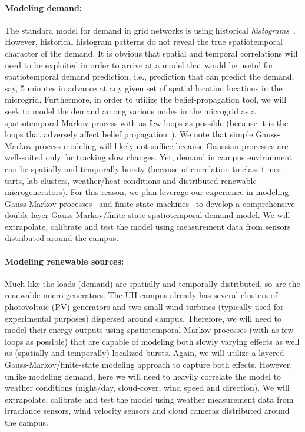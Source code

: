 \paragraph{Modeling demand:} The standard model for demand in grid
networks is using historical {\em histograms}~\cite{several}.
However, historical histogram patterns do not reveal the true
spatiotemporal character of the demand. It is obvious that spatial
and temporal correlations will need to be exploited in order to
arrive at a model that would be useful for spatiotemporal demand
prediction, i.e., prediction that can predict the demand, say, 5
minutes in advance at any given set of spatial location locations in
the microgrid. Furthermore, in order to utilize the
belief-propagation tool, we will seek to model the demand among
various nodes in the microgrid as a spatiotemporal Markov process
with as few loops as possible (because it is the loops that
adversely affect belief propagation~\cite{a,b,c}). We note that
simple Gauss-Markov process modeling will likely not suffice because
Gaussian processes are well-suited only for tracking slow changes.
Yet, demand in campus environment can be spatially and temporally
bursty (because of correlation to class-times tarts, lab-clusters,
weather/heat conditions and distributed renewable microgenerators).
For this reason, we plan leverage our experience in modeling
Gauss-Markov processes~\cite{my-own} and finite-state
machines~\cite{my-own} to develop a comprehensive double-layer
Gauss-Markov/finite-state spatiotemporal demand model. We will
extrapolate, calibrate and test the model using measurement data
from sensors distributed around the campus.

\paragraph{Modeling renewable sources:} Much like the loads (demand)
are spatially and temporally distributed, so are the renewable
micro-generators. The UH campus already has several clusters of
photovoltaic (PV) generators and two small wind turbines (typically
used for experimental purposes) dispersed around campus. Therefore,
we will need to model their energy outputs using spatiotemporal
Markov processes (with as few loops as possible) that are capable of
modeling both slowly varying effects as well as (spatially and
temporally) localized bursts. Again, we will utilize a layered
Gauss-Markov/finite-state modeling approach to capture both effects.
However, unlike modeling demand, here we will need to heavily
correlate the model to weather conditions (night/day, cloud-cover,
wind speed and direction). We will extrapolate, calibrate and test
the model using weather measurement data from irradiance sensors,
wind velocity sensors and cloud cameras distributed around the
campus.


